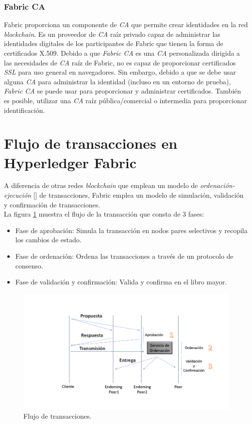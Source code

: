 \subsubsection{Fabric CA}
Fabric proporciona un componente de \emph{CA} que permite crear identidades en la red \emph{blockchain}. Es un proveedor de \emph{CA} ra\'iz privado capaz de administrar las identidades digitales de los participantes de Fabric que tienen la forma de certificados X.509. Debido a que \emph{Fabric CA} es una \emph{CA} personalizada dirigida a las necesidades de \emph{CA} ra\'iz de Fabric, no es capaz de proporcionar certificados \emph{SSL} para uso general en navegadores. Sin embargo, debido a que se debe usar alguna \emph{CA} para administrar la identidad (incluso en un entorno de prueba), \emph{Fabric CA} se puede usar para proporcionar y administrar certificados. Tambi\'en es posible, utilizar una \emph{CA} ra\'iz p\'ublica/comercial o intermedia para proporcionar identificaci\'on.


\section{Flujo de transacciones en Hyperledger Fabric}
A diferencia de otras redes \emph{blockchain} que emplean un modelo de \emph{ordenaci\'on-ejecución} [\cite{vukolic2017rethinking}] de transacciones, Fabric emplea un modelo de simulaci\'on, validaci\'on y confirmaci\'on de transacciones.\\ 

La figura \ref{FlujoTransacciones} muestra el flujo de la transacci\'on que consta de 3 fases:
\begin{itemize}
\item[1] Fase de aprobaci\'on: Simula la transacci\'on en nodos pares selectivos y recopila los cambios de estado.
\item[2] Fase de ordenaci\'on: Ordena las transacciones a trav\'es de un protocolo de consenso.
\item[3] Fase de validaci\'on y confirmaci\'on: Valida y confirma en el libro mayor.
\end{itemize}



\begin{figure}[h]
\centering
\includegraphics[width=0.6\linewidth]{Graphics/FlujoTransacciones.png}
\caption{Flujo de transacciones.}
\label{FlujoTransacciones}
\end{figure}

